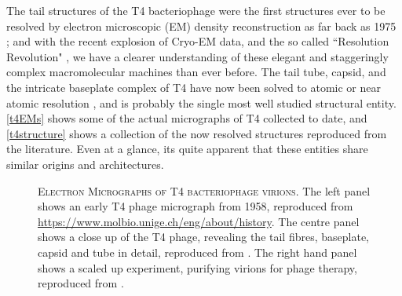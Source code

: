 The tail structures of the T4 bacteriophage were the first structures ever to be resolved by electron microscopic (EM) density reconstruction as far back as 1975 \citep{Amos1975}; and with the recent explosion of Cryo-EM data, and the so called ``Resolution Revolution" \citep{Kuhlbrandt2014}, we have a clearer understanding of these elegant and staggeringly complex macromolecular machines than ever before. The tail tube, capsid, and the intricate baseplate complex of T4 have now been solved to atomic or near atomic resolution \citep{Aksyuk2009, Kostyuchenko2003, Kostyuchenko2005, Fokine2004, Fokine2013, Rossmann2004, Taylor2016b, Lan2014}, and is probably the single most well studied structural entity. \vref{t4EMs} shows some of the actual micrographs of T4 collected to date, and \vref{t4structure} shows a collection of the now resolved structures reproduced from the literature. Even at a glance, its quite apparent that these entities share similar origins and architectures.

\vspace{0.1cm}
\begin{figure}[h]
\centering
    \begin{subfigure}[b]{0.41\textwidth}
        \centering
        {%
\setlength{\fboxsep}{0pt}%
\setlength{\fboxrule}{1pt}%
            }%
    \end{subfigure}%
        \begin{subfigure}[t]{0.16\textwidth}
        \centering
        {%
\setlength{\fboxsep}{0pt}%
\setlength{\fboxrule}{1pt}%
        }%
    \end{subfigure}%
    \begin{subfigure}[t]{0.41\textwidth}
        \centering
        {%
\setlength{\fboxsep}{0pt}%
\setlength{\fboxrule}{1pt}%
        }%
        \end{subfigure}%
	\captionsetup{singlelinecheck=off, justification=justified, font=footnotesize, aboveskip=10pt}
	\caption[Electron micrographs of Bacteriophage T4]{\textsc{\normalsize Electron Micrographs of T4 bacteriophage virions.}\vspace{0.1cm} \newline The left panel shows an early T4 phage micrograph from 1958, reproduced from \url{https://www.molbio.unige.ch/eng/about/history}. The centre panel shows a close up of the T4 phage, revealing the tail fibres, baseplate, capsid and tube in detail, reproduced from \cite{Knott2013}. The right hand panel shows a scaled up experiment, purifying virions for phage therapy, reproduced from \cite{Bourdin2014}.}
	\label{t4EMs}
\end{figure}


